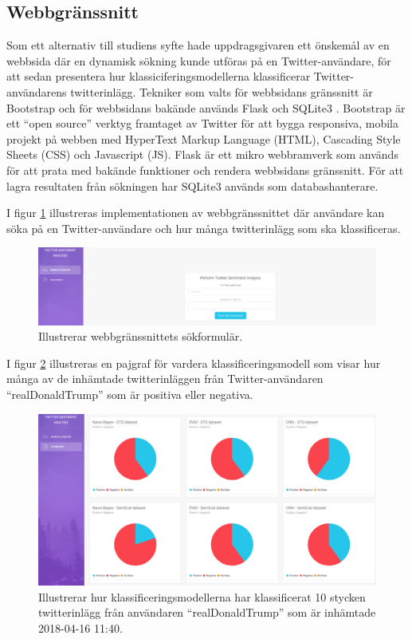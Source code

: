 \documentclass{kaumasters} %
\begin{document}
\subsection{Webbgränssnitt}
Som ett alternativ till studiens syfte hade uppdragsgivaren ett önskemål av en webbsida där en dynamisk sökning kunde utföras på en Twitter-användare, för att sedan presentera hur klassiciferingsmodellerna klassificerar Twitter-användarens twitterinlägg.
Tekniker som valts för webbsidans gränssnitt är Bootstrap \cite{gui:001} och för webbsidans bakände används Flask \cite{gui:002} och SQLite3 \cite{gui:003}.
Bootstrap är ett “open source” verktyg framtaget av Twitter för att bygga responsiva, mobila projekt på webben med HyperText Markup Language (HTML), Cascading Style Sheets (CSS) och Javascript (JS). Flask är ett mikro webbramverk som används för att prata med bakände funktioner och rendera webbsidans gränssnitt. För att lagra resultaten från sökningen har SQLite3 används som databashanterare.

I figur \ref{fig:gui_form} illustreras implementationen av webbgränssnittet där användare kan söka på en Twitter-användare och hur många twitterinlägg som ska klassificeras.

\begin{figure}[H]
\includegraphics[width=12cm]{GUI_form}
\centering
\caption{Illustrerar webbgränssnittets sökformulär.}
\label{fig:gui_form}
\end{figure}

I figur \ref{fig:gui_search_g} illustreras en pajgraf för vardera klassificeringsmodell som visar hur många av de inhämtade twitterinläggen från Twitter-användaren “realDonaldTrump” som är positiva eller negativa.

\begin{figure}[H]
\includegraphics[width=12cm]{GUI_search_graph}
\centering
\caption{Illustrerar hur klassificeringsmodellerna har klassificerat 10 stycken twitterinlägg från användaren “realDonaldTrump” som är inhämtade 2018-04-16 11:40.}
\label{fig:gui_search_g}
\end{figure}
\end{document}

